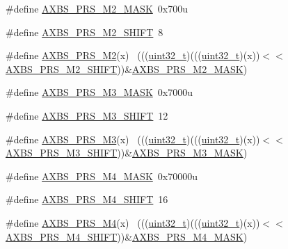 \begin{DoxyCompactItemize}
\item 
\#define \hyperlink{group___a_x_b_s___register___masks_gacd2feac8facc9d0b21f438eef172fd81}{A\+X\+B\+S\+\_\+\+P\+R\+S\+\_\+\+M2\+\_\+\+M\+A\+SK}~0x700u
\item 
\#define \hyperlink{group___a_x_b_s___register___masks_gacf78955a5852e31c71c1542d873df6b3}{A\+X\+B\+S\+\_\+\+P\+R\+S\+\_\+\+M2\+\_\+\+S\+H\+I\+FT}~8
\item 
\#define \hyperlink{group___a_x_b_s___register___masks_ga62c82426cf92f9a2296ab84014ee8096}{A\+X\+B\+S\+\_\+\+P\+R\+S\+\_\+\+M2}(x)                                                  ~(((\hyperlink{_p_e___types_8h_a33594304e786b158f3fb30289278f5af}{uint32\+\_\+t})(((\hyperlink{_p_e___types_8h_a33594304e786b158f3fb30289278f5af}{uint32\+\_\+t})(x))$<$$<$\hyperlink{group___a_x_b_s___register___masks_gacf78955a5852e31c71c1542d873df6b3}{A\+X\+B\+S\+\_\+\+P\+R\+S\+\_\+\+M2\+\_\+\+S\+H\+I\+FT}))\&\hyperlink{group___a_x_b_s___register___masks_gacd2feac8facc9d0b21f438eef172fd81}{A\+X\+B\+S\+\_\+\+P\+R\+S\+\_\+\+M2\+\_\+\+M\+A\+SK})
\item 
\#define \hyperlink{group___a_x_b_s___register___masks_gab4b4274fe732ec08377a17c98fcb3c89}{A\+X\+B\+S\+\_\+\+P\+R\+S\+\_\+\+M3\+\_\+\+M\+A\+SK}~0x7000u
\item 
\#define \hyperlink{group___a_x_b_s___register___masks_gaf63a98f7cff8ba76061096736d5fa14e}{A\+X\+B\+S\+\_\+\+P\+R\+S\+\_\+\+M3\+\_\+\+S\+H\+I\+FT}~12
\item 
\#define \hyperlink{group___a_x_b_s___register___masks_ga2fa3a214a6e094d0460b17d28fe0754f}{A\+X\+B\+S\+\_\+\+P\+R\+S\+\_\+\+M3}(x)                                                  ~(((\hyperlink{_p_e___types_8h_a33594304e786b158f3fb30289278f5af}{uint32\+\_\+t})(((\hyperlink{_p_e___types_8h_a33594304e786b158f3fb30289278f5af}{uint32\+\_\+t})(x))$<$$<$\hyperlink{group___a_x_b_s___register___masks_gaf63a98f7cff8ba76061096736d5fa14e}{A\+X\+B\+S\+\_\+\+P\+R\+S\+\_\+\+M3\+\_\+\+S\+H\+I\+FT}))\&\hyperlink{group___a_x_b_s___register___masks_gab4b4274fe732ec08377a17c98fcb3c89}{A\+X\+B\+S\+\_\+\+P\+R\+S\+\_\+\+M3\+\_\+\+M\+A\+SK})
\item 
\#define \hyperlink{group___a_x_b_s___register___masks_ga489c3dd8930bf3ada2f36146c4e3bc61}{A\+X\+B\+S\+\_\+\+P\+R\+S\+\_\+\+M4\+\_\+\+M\+A\+SK}~0x70000u
\item 
\#define \hyperlink{group___a_x_b_s___register___masks_gaa5c41d2e8da4620d83b63f9ffb3878cd}{A\+X\+B\+S\+\_\+\+P\+R\+S\+\_\+\+M4\+\_\+\+S\+H\+I\+FT}~16
\item 
\#define \hyperlink{group___a_x_b_s___register___masks_ga41c0afaf3c47955a57a3628fb431d892}{A\+X\+B\+S\+\_\+\+P\+R\+S\+\_\+\+M4}(x)                                                  ~(((\hyperlink{_p_e___types_8h_a33594304e786b158f3fb30289278f5af}{uint32\+\_\+t})(((\hyperlink{_p_e___types_8h_a33594304e786b158f3fb30289278f5af}{uint32\+\_\+t})(x))$<$$<$\hyperlink{group___a_x_b_s___register___masks_gaa5c41d2e8da4620d83b63f9ffb3878cd}{A\+X\+B\+S\+\_\+\+P\+R\+S\+\_\+\+M4\+\_\+\+S\+H\+I\+FT}))\&\hyperlink{group___a_x_b_s___register___masks_ga489c3dd8930bf3ada2f36146c4e3bc61}{A\+X\+B\+S\+\_\+\+P\+R\+S\+\_\+\+M4\+\_\+\+M\+A\+SK})
$$
\end{DoxyCompactItemize}
